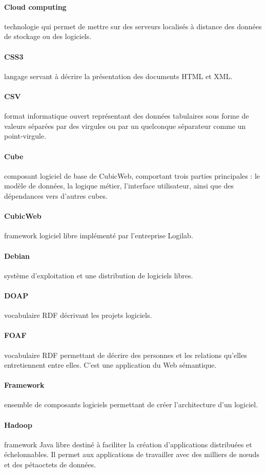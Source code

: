 \documentclass {report}
\begin{document}
\paragraph{Cloud computing}technologie qui permet de mettre sur des serveurs localisés à distance des données de stockage ou des logiciels.
\paragraph{CSS3}langage servant à décrire la présentation des documents HTML et XML.
\paragraph{CSV}format informatique ouvert représentant des données tabulaires sous forme de valeurs séparées par des virgules ou par un quelconque séparateur comme un point-virgule.
\paragraph{Cube}composant logiciel de base de CubicWeb, comportant trois parties principales : le modèle de données, la logique métier, l’interface utilisateur, ainsi que des dépendances vers d’autres cubes. 
\paragraph{CubicWeb}framework logiciel libre implémenté par l'entreprise Logilab.
\paragraph{Debian}système d'exploitation et une distribution de logiciels libres.
\paragraph{DOAP}vocabulaire RDF décrivant les projets logiciels.
\paragraph{FOAF}vocabulaire RDF permettant de décrire des personnes et les relations qu’elles entretiennent entre elles. C'est une application du Web sémantique.
\paragraph{Framework}ensemble de composants logiciels permettant de créer l'architecture d'un logiciel.
\paragraph{Hadoop}framework Java libre destiné à faciliter la création d'applications distribuées et échelonnables. Il permet aux applications de travailler avec des milliers de nœuds et des pétaoctets de données.
\end{document}
